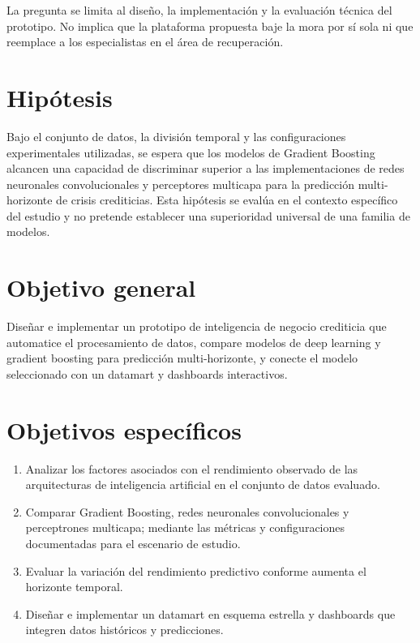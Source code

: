La pregunta se limita al diseño, la implementación y la evaluación técnica del prototipo. No implica que la plataforma propuesta baje la mora por sí sola ni que reemplace a los especialistas en el área de recuperación.

\section{Hipótesis}

Bajo el conjunto de datos, la división temporal y las configuraciones experimentales utilizadas, se espera que los modelos de Gradient Boosting alcancen una capacidad de discriminar superior a las implementaciones de redes neuronales convolucionales y perceptores multicapa para la predicción multi-horizonte de crisis crediticias. Esta hipótesis se evalúa en el contexto específico del estudio y no pretende establecer una superioridad universal de una familia de modelos.

\section{Objetivo general}

Diseñar e implementar un prototipo de inteligencia de negocio crediticia que automatice el procesamiento de datos, compare modelos de deep learning y gradient boosting para predicción multi-horizonte, y conecte el modelo seleccionado con un datamart y dashboards interactivos.

\section{Objetivos específicos}

\begin{enumerate}
    \item Analizar los factores asociados con el rendimiento observado de las arquitecturas de inteligencia artificial en el conjunto de datos evaluado.
    \item Comparar Gradient Boosting, redes neuronales convolucionales y perceptrones multicapa; mediante las métricas y configuraciones documentadas para el escenario de estudio.
    \item Evaluar la variación del rendimiento predictivo conforme aumenta el horizonte temporal.
    \item Diseñar e implementar un datamart en esquema estrella y dashboards que integren datos históricos y predicciones.
\end{enumerate}

